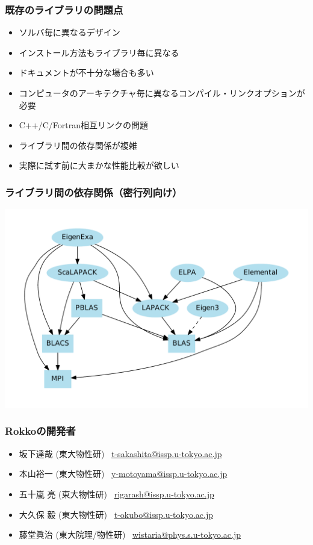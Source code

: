 \begin{frame}
  \frametitle{既存のライブラリの問題点}
  \begin{itemize}
    \setlength{\itemsep}{1em}
  \item ソルバ毎に異なるデザイン
  \item インストール方法もライブラリ毎に異なる
  \item ドキュメントが不十分な場合も多い
  \item コンピュータのアーキテクチャ毎に異なるコンパイル・リンクオプションが必要
  \item C++/C/Fortran相互リンクの問題
  \item ライブラリ間の依存関係が複雑
  \item 実際に試す前に大まかな性能比較が欲しい
  \end{itemize}
\end{frame}

\begin{frame}
  \frametitle{ライブラリ間の依存関係（密行列向け）}
  \begin{center}
    \includegraphics[height=0.8\textheight]{figure/eigensolver_dependency.pdf}
  \end{center}
\end{frame}

\begin{frame}
  \frametitle{Rokkoの開発者}
  \begin{itemize}
    \setlength{\itemsep}{1em}
  \item 坂下達哉 (東大物性研) \ \href{mailto:t-sakashita@issp.u-tokyo.ac.jp}{t-sakashita@issp.u-tokyo.ac.jp}
  \item 本山裕一 (東大物性研) \ \href{mailto:y-motoyama@issp.u-tokyo.ac.jp}{y-motoyama@issp.u-tokyo.ac.jp}
  \item 五十嵐 亮 (東大物性研) \ \href{mailto:rigarash@issp.u-tokyo.ac.jp}{rigarash@issp.u-tokyo.ac.jp}
  \item 大久保 毅 (東大物性研) \ \href{mailto:t-okubo@issp.u-tokyo.ac.jp}{t-okubo@issp.u-tokyo.ac.jp}
  \item 藤堂眞治 (東大院理/物性研) \ \href{mailto:wistaria@phys.s.u-tokyo.ac.jp}{wistaria@phys.s.u-tokyo.ac.jp}
  \end{itemize}
\end{frame}

